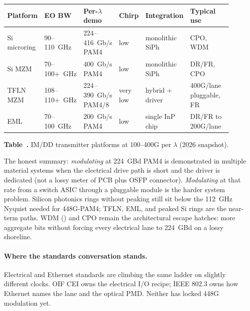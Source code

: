 \begin{table}[ht]
\label{tab:tx-modulator}%
\centering
\setlength{\tabcolsep}{3pt}%
\footnotesize
\renewcommand{\arraystretch}{1.25}%
\begin{tabular}{@{}p{0.11\linewidth}p{0.11\linewidth}p{0.15\linewidth}p{0.09\linewidth}p{0.16\linewidth}p{0.30\linewidth}@{}}
\toprule
Platform & EO BW & Per-$\lambda$ demo & Chirp & Integration & Typical use \\
\midrule
Si microring & 90--110~GHz & 224--416~Gb/s PAM4 & low & monolithic SiPh & CPO, WDM \\
\addlinespace[1.5em]
Si MZM & 70--100+~GHz & 400~Gb/s PAM4 & low & monolithic SiPh & DR/FR, CPO \\
\addlinespace[1.5em]
TFLN MZM & 108--110+~GHz & 224--390~Gb/s PAM4/8 & very low & hybrid + driver & 400G/lane pluggable, FR \\
\addlinespace[1.5em]
EML & 70--100~GHz & 200~Gb/s PAM4 & low & single InP chip & DR/FR to 200G/lane \\
\bottomrule
\end{tabular}
\par\medskip
{\raggedright\footnotesize\textbf{Table~\thetable.} IM/DD transmitter platforms at 100--400G per $\lambda$ (2026 snapshot).\par}
\end{table}

The honest summary: \emph{modulating} at 224~GBd PAM4 is demonstrated in multiple
material systems when the electrical drive path is short and the driver is
dedicated (not a lossy meter of PCB plus OSFP connector). \emph{Modulating} at that
rate from a switch ASIC through a pluggable module is the harder system problem.
Silicon photonics rings without peaking still sit below the 112~GHz Nyquist needed
for 448G-PAM4; TFLN, EML, and peaked Si rings are the near-term paths. WDM
() and CPO remain the architectural escape hatches: more
aggregate bits without forcing every electrical lane to 224~GBd on a lossy
shoreline.

\paragraph{Where the standards conversation stands.}
Electrical and Ethernet standards are climbing the same ladder on slightly
different clocks. OIF CEI owns the electrical I/O recipe; IEEE 802.3 owns how
Ethernet names the lane and the optical PMD. Neither has locked 448G modulation
yet.

